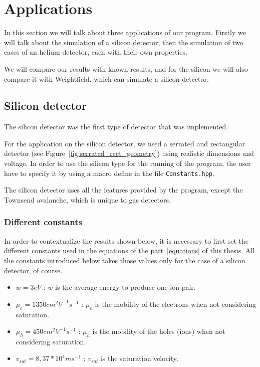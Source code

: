 \documentclass[11pt]{article}
\begin{document}

\section{Applications}

	In this section we will talk about three applications of our program.
	Firstly we will talk about the simulation of a silicon detector, then the
	simulation of two cases of an helium detector, each with their own properties.

	We will compare our results with known results, and for the silicon we will also
	compare it with Weightfield, which can simulate a silicon detector.

	\subsection{Silicon detector}

		The silicon detector was the first type of detector that was implemented.

		For the application on the silicon detector, we used a serrated and rectangular detector
		(see Figure~\ref{fig:serrated_rect_geometry}) using realistic dimensions and voltage.
		In order to use the silicon type for the running of the program, the user have to specify
		it by using a macro define in the file \texttt{Constants.hpp}.

		The silicon detector uses all the features provided by the program, except the Townsend
		avalanche, which is unique to gas detectors.

		\subsubsection*{Different constants}

			In order to contextualize the results shown below, it is necessary to first set the
			different constants used in the equations of the part~\ref{equations} of this thesis.
			All the constants introduced below takes those values only for the case of a silicon
			detector, of course.

			\begin{itemize}

				\item $w = 3 eV$ : $w$ is the average energy to produce one ion-pair.
				\item $\mu_e = 1350 cm^2V^{-1}s^{-1}$ : $\mu_e$ is the mobility of the electrons
					when not considering saturation.
				\item $\mu_h = 450 cm^2V^{-1}s^{-1}$ : $\mu_h$ is the mobility of the holes (ions)
					when not considering saturation.
				\item $v_{sat} = 8,37*10^{4} ms^{-1}$ : $v_{sat}$ is the saturation velocity.

			\end{itemize}
\end{document}
